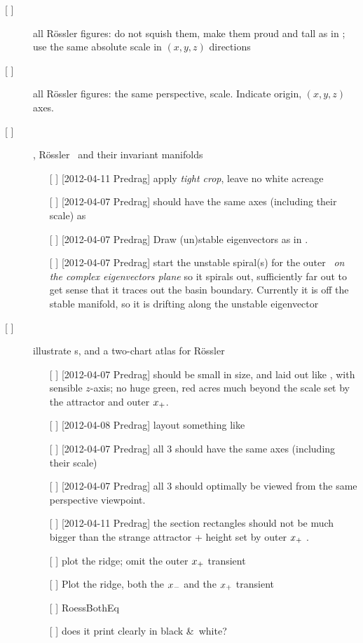 \begin{description}
\item[{[ ]}] all R\"ossler figures: do not squish them, make them proud
        and tall as in ; use the same absolute scale
        in $(x,y,z)$ directions
\item[{[ ]}] all R\"ossler figures: the same perspective, scale. Indicate origin, $(x,y,z)$ axes.
\item[{[ ]}] ,
        R\"ossler \eqva\ and their invariant manifolds
    \begin{itemize}
        \item[{[ ]}] [2012-04-11 Predrag] apply \emph{tight crop}, leave no white acreage
        \item[{[ ]}] [2012-04-07 Predrag] should have the same axes
            (including their scale) as 
        \item[{[ ]}] [2012-04-07 Predrag] Draw (un)stable eigenvectors as
                in .
        \item[{[ ]}] [2012-04-07 Predrag] start the unstable spiral(s)
            for the outer \eqv\ \emph{on the complex eigenvectors plane}
            so it spirals out, sufficiently far out to get sense that it
            traces out the basin boundary. Currently it is off the stable
            manifold, so it is drifting along the unstable eigenvector
    \end{itemize}

\item[{[ ]}]
    illustrate \poincBord s, and a two-chart atlas for R\"ossler
    \begin{itemize}
        \item[{[ ]}] [2012-04-07 Predrag] should be small in size, and laid out like
            , with sensible $z$-axis; no huge green,
            red acres much beyond the scale set by the attractor and
            outer $x_{+}$.
        \item[{[ ]}] [2012-04-08 Predrag] layout something like 
        \item[{[ ]}] [2012-04-07 Predrag] all 3 should have the same axes
            (including their scale)
        \item[{[ ]}] [2012-04-07 Predrag] all 3 should optimally be viewed from the same
            perspective viewpoint.
        \item[{[ ]}] [2012-04-11 Predrag] the section rectangles should
            not be much bigger than the strange attractor + height set by
            outer  $x_{+}$ \eqv.
        \item[{[ ]}]  plot the ridge; omit the
            outer $x_{+}$ transient
        \item[{[ ]}]  Plot
            the ridge, both the $x_{-}$ and the $x_{+}$ transient
        \item[{[ ]}]  RoessBothEq
        \item[{[ ]}] does it print clearly in black \&\ white?
    \end{itemize}


\end{description}

